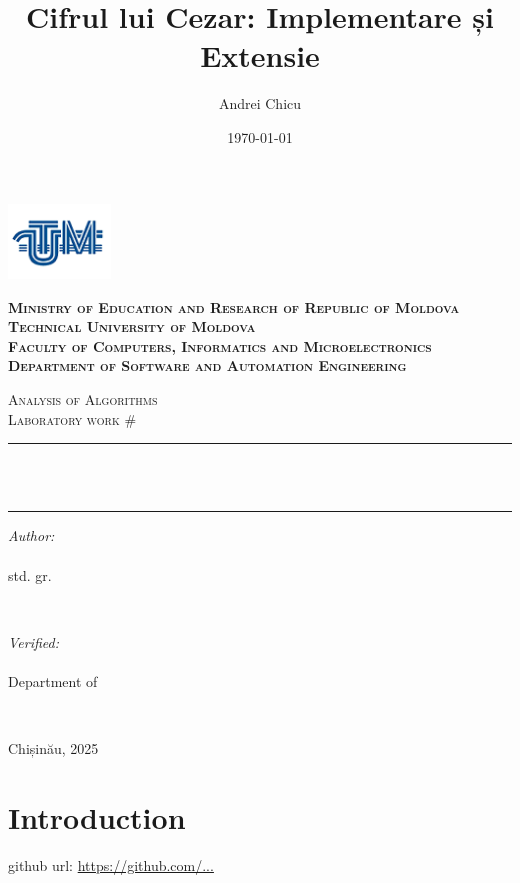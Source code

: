 \documentclass[a4paper,12pt]{article}
\author{Andrei Chicu}
\date{\today}
\title{Cifrul lui Cezar: Implementare și Extensie}
\begin{document}
\makeatletter
\begin{titlepage}
\centering

\includegraphics[height=2cm]{utm_logo.png}

\bfseries
\textsc{Ministry of Education and Research of Republic of Moldova} \\
\textsc{Technical University of Moldova} \\
\textsc{Faculty of Computers, Informatics and Microelectronics} \\
\textsc{Department of Software and Automation Engineering} \\
\mdseries

\vfill

\textsc{\Large Analysis of Algorithms} \\
\textsc{\large Laboratory work \#\@labno}\\[0.5cm]

\vspace{12pt}
\newcommand{\HRule}{\rule{\linewidth}{0.5mm}}
\HRule \\[0.2cm]
{ \LARGE \bfseries \@title }\\[0.4cm]
\HRule
\vfill

\begin{minipage}[t]{0.4\textwidth}
\begin{flushleft} \large
\emph{Author:} \\
\@author\\                        
std. gr. \@group
\end{flushleft}
\end{minipage}
~
\begin{minipage}[t]{0.4\textwidth}
\raggedleft \large
\emph{Verified:} \\
\@prof \\
Department of \textsc{\@profdep}
\end{minipage}\\[3cm]
\vfill

Chișinău, 2025
\end{titlepage}
\makeatother
\setcounter{page}{2}
\section{Introduction}
\label{sec:org285a67a}
github url: \url{https://github.com/...}
\end{document}
